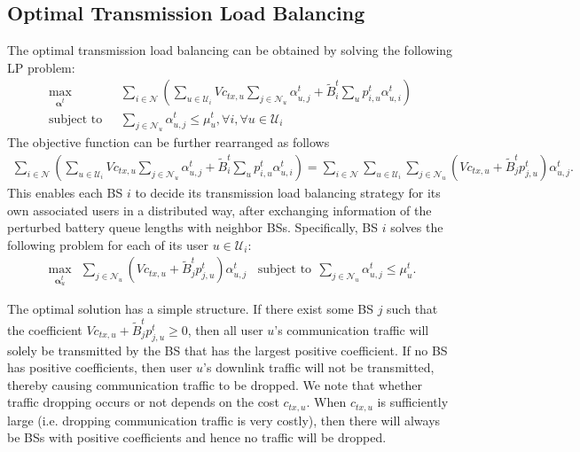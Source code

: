 \documentclass[12pt, draftclsnofoot, letterpaper, onecolumn]{IEEEtran}
\begin{document}
\subsection{Optimal Transmission Load Balancing}
The optimal transmission load balancing can be obtained by solving the following LP problem:
\begin{subequations}
	\begin{align}
	\max_{\bm\alpha^t}&~~~\sum_{i\in\mathcal{N}} \left( \sum_{u\in\mathcal{U}_i}Vc_{tx,u}\sum_{j\in\mathcal{N}_u}\alpha^t_{u,j} + \tilde{B}^t_{i}\sum_{u} p^t_{i,u}\alpha^t_{u,i}\right)\label{TLB}\\
	\text{subject to}&~~~\sum_{j\in\mathcal{N}_u}\alpha^t_{u,j} \leq \mu^t_{u}, \forall i, \forall u\in\mathcal{U}_i
	\end{align}
\end{subequations}
The objective function can be further rearranged as follows
\begin{align*}
\sum_{i\in\mathcal{N}} \left( \sum_{u\in\mathcal{U}_i}Vc_{tx,u}\sum_{j\in\mathcal{N}_u}\alpha^t_{u,j} + \tilde{B}^t_{i}\sum_{u} p^t_{i,u}\alpha^t_{u,i}\right)
=\sum_{i\in\mathcal{N}} \sum_{u\in\mathcal{U}_i} \sum_{j\in\mathcal{N}_u}(Vc_{tx,u} + \tilde{B}^t_j p^t_{j,u})\alpha^t_{u,j}.
\end{align*}
This enables each BS $i$ to decide its transmission load balancing strategy for its own associated users in a distributed way, after exchanging information of the perturbed battery queue lengths with neighbor BSs. Specifically, BS $i$ solves the following problem for each of its user $u\in\mathcal{U}_i$:
\begin{subequations}
	\begin{align}
\max_{\bm\alpha^t_u}~~\sum_{j\in\mathcal{N}_u}(Vc_{tx,u}+\tilde{B}^t_jp^t_{j,u})\alpha^t_{u,j} ~~~~\text{subject to}~~\sum_{j\in\mathcal{N}_u}\alpha^t_{u,j} \leq \mu^t_{u}. \label{TLB-i}
    \end{align}
\end{subequations}


The optimal solution has a simple structure. If there exist some BS $j$ such that the coefficient $Vc_{tx,u} + \tilde{B}^t_j p^t_{j,u} \geq 0$, then all user $u$'s communication traffic will solely be transmitted by the BS that has the largest positive coefficient. If no BS has positive coefficients, then user $u$'s downlink traffic will not be transmitted, thereby causing communication traffic to be dropped. We note that whether traffic dropping occurs or not depends on the cost $c_{tx,u}$. When $c_{tx,u}$ is sufficiently large (i.e. dropping communication traffic is very costly), then there will always be BSs with positive coefficients and hence no traffic will be dropped.
\end{document}
